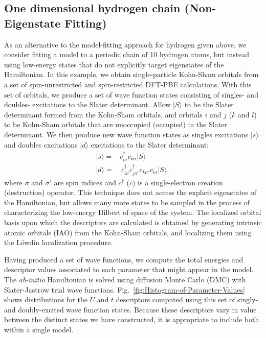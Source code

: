 \documentclass[prl,12pt,onecolumn,nofootinbib,notitlepage,english,superscriptaddress]{revtex4-1}
\begin{document}
\subsection{One dimensional hydrogen chain (Non-Eigenstate Fitting)}

As an alternative to the model-fitting approach for hydrogen given above, we consider fitting a model to a periodic chain of 10 hydrogen atoms, but instead using low-energy states that do not explicitly target eigenstates of the Hamiltonian. In this example, we obtain single-particle Kohn-Sham orbitals from a set of spin-unrestricted and spin-restricted DFT-PBE calculations. With this set of orbitals, we produce a set of wave function states consisting of singles- and doubles- excitations to the Slater determinant. Allow $| S \rangle $ to be the Slater determinant formed from the Kohn-Sham orbitals, and orbitals $i$ and $j$ ($k$ and $l$) to be Kohn-Sham orbitals that are unoccupied (occupied) in the Slater determinant. We then produce new wave function states as singles excitations $|s \rangle$ and doubles excitations $| d \rangle$ excitations to the Slater determinant:
\begin{subequations}
\begin{eqnarray}
| s \rangle = & c^\dagger_{i \sigma} c_{k \sigma}   | S \rangle \\
| d \rangle = & \: c^\dagger_{i \sigma} c^\dagger_{j \sigma'} c_{k \sigma'} c_{l \sigma}   | S \rangle ,
\end{eqnarray}
\end{subequations}
where $\sigma$ and $\sigma'$ are spin indices and $c^\dagger$ ($c$) is a single-electron creation (destruction) operator. This technique does not access the explicit eigenstates of the Hamiltonian, but allows many more states to be sampled in the process of characterizing the low-energy Hilbert of space of the system. The localized orbital basis upon which the descriptors are calculated is obtained by generating intrinsic atomic orbitals (IAO) from the Kohn-Sham orbitals, and localizing them using the L\"owdin localization procedure.

Having produced a set of wave functions, we compute the total energies and descriptor values associated to each parameter that might appear in the model. The \textit{ab-initio} Hamiltonian is solved using diffusion Monte Carlo (DMC) with Slater-Jastrow trial wave functions. Fig.~\ref{fig:Histogram-of-Parameter-Values} shows distributions for the $U$ and $t$ descriptors computed using this set of singly- and doubly-excited wave function states.  Because these descriptors vary in value between the distinct states we have constructed, it is appropriate to include both within a single model.
\end{document}
